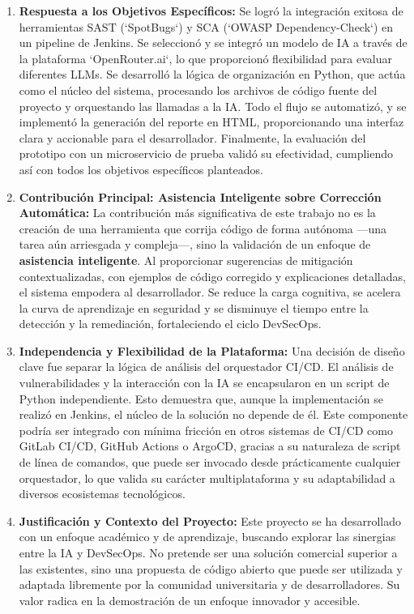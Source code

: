 \begin{enumerate}
    \item \textbf{Respuesta a los Objetivos Específicos:} Se logró la integración exitosa de herramientas SAST (`SpotBugs`) y SCA (`OWASP Dependency-Check`) en un pipeline de Jenkins. Se seleccionó y se integró un modelo de IA a través de la plataforma `OpenRouter.ai`, lo que proporcionó flexibilidad para evaluar diferentes LLMs. Se desarrolló la lógica de organización en Python, que actúa como el núcleo del sistema, procesando los archivos de código fuente del proyecto y orquestando las llamadas a la IA. Todo el flujo se automatizó, y se implementó la generación del reporte en HTML, proporcionando una interfaz clara y accionable para el desarrollador. Finalmente, la evaluación del prototipo con un microservicio de prueba validó su efectividad, cumpliendo así con todos los objetivos específicos planteados.

    \item \textbf{Contribución Principal: Asistencia Inteligente sobre Corrección Automática:} La contribución más significativa de este trabajo no es la creación de una herramienta que corrija código de forma autónoma ---una tarea aún arriesgada y compleja---, sino la validación de un enfoque de \textbf{asistencia inteligente}. Al proporcionar sugerencias de mitigación contextualizadas, con ejemplos de código corregido y explicaciones detalladas, el sistema empodera al desarrollador. Se reduce la carga cognitiva, se acelera la curva de aprendizaje en seguridad y se disminuye el tiempo entre la detección y la remediación, fortaleciendo el ciclo DevSecOps.

    \item \textbf{Independencia y Flexibilidad de la Plataforma:} Una decisión de diseño clave fue separar la lógica de análisis del orquestador CI/CD. El análisis de vulnerabilidades y la interacción con la IA se encapsularon en un script de Python independiente. Esto demuestra que, aunque la implementación se realizó en Jenkins, el núcleo de la solución no depende de él. Este componente podría ser integrado con mínima fricción en otros sistemas de CI/CD como GitLab CI/CD, GitHub Actions o ArgoCD,  gracias a su naturaleza de script de línea de comandos, que puede ser invocado desde prácticamente cualquier orquestador, lo que valida su carácter multiplataforma y su adaptabilidad a diversos ecosistemas tecnológicos.

    \item \textbf{Justificación y Contexto del Proyecto:} Este proyecto se ha desarrollado con un enfoque académico y de aprendizaje, buscando explorar las sinergias entre la IA y DevSecOps. No pretende ser una solución comercial superior a las existentes, sino una propuesta de código abierto que puede ser utilizada y adaptada libremente por la comunidad universitaria y de desarrolladores. Su valor radica en la demostración de un enfoque innovador y accesible.
\end{enumerate}

